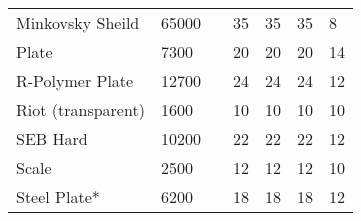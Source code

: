 \documentclass[twoside]{book}
\begin{document}
\begin{longtable}{p{1.25in}llp{3em}p{3em}p{3em}p{3em}}
  \raggedright
           Minkovsky Sheild 
  &
   65000 
  &
  
  &
   35 
  &
   35 
  &
   35 
  &
   8 
  \tabularnewline
      
  \raggedright
           Plate 
  &
   7300 
  &
  
  &
   20 
  &
   20 
  &
   20 
  &
   14 
  \tabularnewline
      
  \raggedright
           R-Polymer Plate 
  &
   12700 
  &
  
  &
   24 
  &
   24 
  &
   24 
  &
   12 
  \tabularnewline
      
  \raggedright
           Riot (transparent) 
  &
   1600 
  &
  
  &
   10 
  &
   10 
  &
   10 
  &
   10 
  \tabularnewline
      
  \raggedright
           SEB Hard 
  &
   10200 
  &
  
  &
   22 
  &
   22 
  &
   22 
  &
   12 
  \tabularnewline
      
  \raggedright
           Scale 
  &
   2500 
  &
  
  &
   12 
  &
   12 
  &
   12 
  &
   10 
  \tabularnewline
      
  \raggedright
           Steel Plate* 
  &
   6200 
  &
  
  &
   18 
  &
   18 
  &
   18 
  &
   12 
  \tabularnewline
      
\end{longtable}
    
\end{document}
